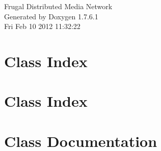 \documentclass[a4paper]{book}
\begin{document}
\hypersetup{pageanchor=false,citecolor=blue}
\begin{titlepage}
\vspace*{7cm}
\begin{center}
{\Large \-Frugal \-Distributed \-Media \-Network }\\
\vspace*{1cm}
{\large \-Generated by Doxygen 1.7.6.1}\\
\vspace*{0.5cm}
{\small Fri Feb 10 2012 11:32:22}\\
\end{center}
\end{titlepage}
\clearemptydoublepage
{}
\tableofcontents
\clearemptydoublepage
{}
\hypersetup{pageanchor=true,citecolor=blue}
\chapter{\-Class \-Index}

\chapter{\-Class \-Index}

\chapter{\-Class \-Documentation}



















\printindex
\end{document}
